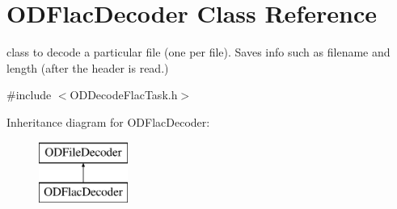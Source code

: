 \hypertarget{class_o_d_flac_decoder}{}\section{O\+D\+Flac\+Decoder Class Reference}
\label{class_o_d_flac_decoder}


class to decode a particular file (one per file). Saves info such as filename and length (after the header is read.)  




{\ttfamily \#include $<$O\+D\+Decode\+Flac\+Task.\+h$>$}

Inheritance diagram for O\+D\+Flac\+Decoder\+:\begin{figure}[H]
\begin{center}
\leavevmode
\includegraphics[height=2.000000cm]{class_o_d_flac_decoder}
\end{center}
\end{figure}
